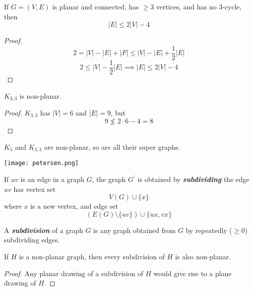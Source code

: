 \begin{thmbox}
    \begin{corollary}
        If $ G=(V,E) $ is planar and connected,
        has $ \geqslant 3 $ vertices, and has no
        $ 3 $-cycle, then
        \[ |E|\leqslant 2|V|-4 \]
    \end{corollary}
\end{thmbox}
\begin{proof}
    \[ 2=|V|-|E|+|F|\leqslant |V|-|E|+\frac{1}{2} |E| \]
    \[ 2\leqslant |V|-\frac{1}{2} |E|\implies |E|\leqslant 2|V|-4 \]
\end{proof}

\begin{thmbox}
    \begin{corollary}
        $ K_{3,3} $ is non-planar.
    \end{corollary}
\end{thmbox}
\begin{proof}
    $ K_{3,3} $ has $ |V|=6 $ and $ |E|=9 $, but
    \[ 9\nleqslant 2\cdot 6-4=8 \]
\end{proof}

$ K_5 $ and $ K_{3,3} $ are non-planar, so are all their super graphs.

\begin{center}
    \texttt{[image: petersen.png]}
\end{center}

\begin{defbox}
    \begin{definition}
        If $ uv $ is an edge in a graph $ G $, the graph $ G^{\prime} $
        is obtained by \textbf{\emph{subdividing}} the edge $ uv $
        has vertex set
        \[ V(G)\cup \{x\} \]
        where $ x $ is a new vertex, and edge set
        \[ (E(G)\setminus \{uv\})\cup \{ux,vx\} \]
    \end{definition}
\end{defbox}

\begin{defbox}
    \begin{definition}
        A \textbf{\emph{subdivision}} of a graph $ G $ is any graph
        obtained from $ G $ by repeatedly ($ \geqslant 0 $) subdividing edges.
    \end{definition}
\end{defbox}

\begin{thmbox}
    \begin{prop}
        If $ H $ is a non-planar graph, then every subdivision of $ H $
        is also non-planar.
    \end{prop}
\end{thmbox}
\begin{proof}
    Any planar drawing of a subdivision of $ H $ would give rise to
    a plane drawing of $ H $.
\end{proof}

